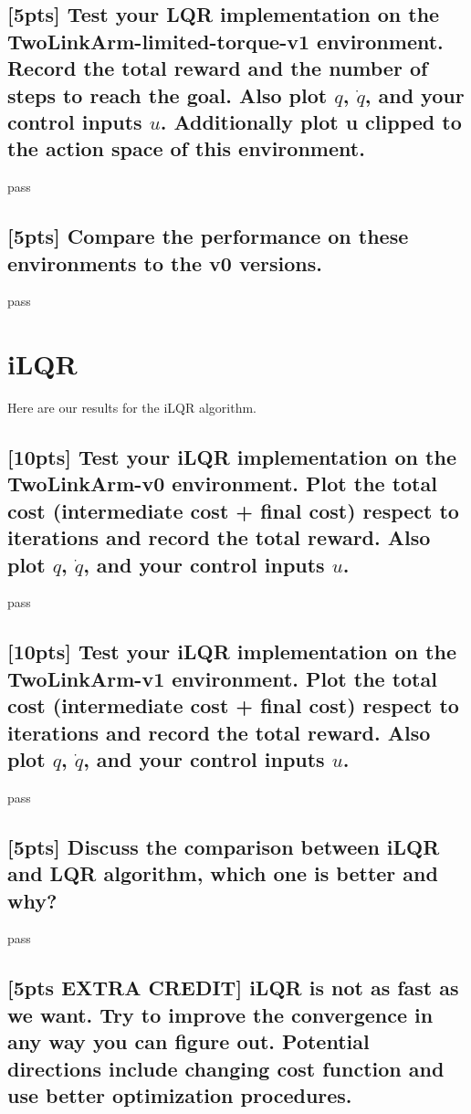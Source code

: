 \documentclass{article}
\begin{document}
\subsection{[5pts] Test your LQR implementation on the TwoLinkArm-limited-torque-v1 environment. Record the total reward and the number of steps to reach the goal. Also plot $q$, $\dot{q}$, and your control inputs $u$. Additionally plot u clipped to the action space of this environment.}

pass

\subsection{[5pts] Compare the performance on these environments to the v0 versions.}

pass





\section{iLQR}
Here are our results for the iLQR algorithm. 

\subsection{[10pts] Test your iLQR implementation on the TwoLinkArm-v0 environment. Plot the total cost (intermediate cost + final cost) respect to iterations and record the total reward. Also plot $q$, $\dot{q}$, and your control inputs $u$.}

pass

\subsection{[10pts] Test your iLQR implementation on the TwoLinkArm-v1 environment. Plot the total cost (intermediate cost + final cost) respect to iterations and record the total reward. Also plot $q$, $\dot{q}$, and your control inputs $u$.}

pass

\subsection{[5pts] Discuss the comparison between iLQR and LQR algorithm, which one is better and why?}

pass

\subsection{[5pts EXTRA CREDIT] iLQR is not as fast as we want. Try to improve the convergence in any way you can figure out. Potential directions include changing cost function and use better optimization procedures.}
\end{document}
